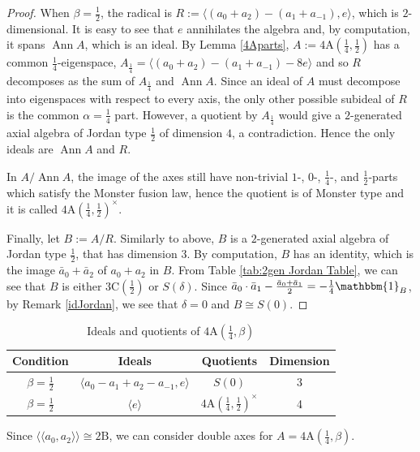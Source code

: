 \documentclass[11pt, a4paper]{article}
\theoremstyle{plain}
\theoremstyle{definition}
\newcommand\al{\alpha}
\newcommand\bt{\beta}
\newcommand\la{\langle}
\newcommand\ra{\rangle}
\newcommand\lla{\langle\!\langle}
\newcommand\rra{\rangle\!\rangle}
\DeclareMathOperator{\Ann}{Ann}
\newcommand{\A}{\mathrm{A}}
\newcommand{\B}{\mathrm{B}}
\newcommand{\C}{\mathrm{C}}
\newcommand{\0}{\overline{0}}
\newcommand{\2}{\overline{2}}
\newcommand{\1}{\mathbbm{1}}
\begin{document}
\begin{proof}
When $\bt = \frac{1}{2}$, the radical is $R := \la (a_0 + a_2) - (a_1 + a_{-1}),  e\ra$, which is $2$-dimensional.  It is easy to see that $e$ annihilates the algebra and, by computation, it spans $\Ann A$, which is an ideal.  By Lemma \ref{4Aparts}, $A := 4\A(\frac{1}{4},\frac{1}{2})$ has a common $\frac{1}{4}$-eigenspace, $A_{\frac{1}{4}} = \la (a_0 + a_2) - (a_1 + a_{-1}) -8e \ra$ and so $R$ decomposes as the sum of $A_{\frac{1}{4}}$ and $\Ann A$.  Since an ideal of $A$ must decompose into eigenspaces with respect to every axis, the only other possible subideal of $R$ is the common $\al = \frac{1}{4}$ part.  However, a quotient by $A_{\frac{1}{4}}$ would give a $2$-generated axial algebra of Jordan type $\frac{1}{2}$ of dimension $4$, a contradiction.  Hence the only ideals are $\Ann A$ and $R$.

In $A/\Ann A$, the image of the axes still have non-trivial $1$-, $0$-, $\frac{1}{4}$-, and $\frac{1}{2}$-parts which satisfy the Monster fusion law, hence the quotient is of Monster type and it is called $4\A(\frac{1}{4}, \frac{1}{2})^\times$.

Finally, let $B := A/R$.  Similarly to above, $B$ is a $2$-generated axial algebra of Jordan type $\frac{1}{2}$, that has dimension $3$.  By computation, $B$ has an identity, which is the image $\bar{a}_0 + \bar{a}_2$ of $a_0 + a_2$ in $B$.  From Table \ref{tab:2gen Jordan Table}, we can see that $B$ is either $3\C(\frac{1}{2})$ or $S(\delta)$.  Since $ \bar{a}_0 \cdot \bar{a}_1 - \frac{\bar{a}_0 + \bar{a}_1}{2} = -\frac{1}{4}\1_B$, by Remark \ref{idJordan}, we see that $\delta = 0$ and $B  \cong S(0)$.
\end{proof}

\begin{table}[h!tb]
	\renewcommand{\arraystretch}{1.5}
	\centering
	\footnotesize
	\begin{tabular}{c|c|c|c}
		\hline
		Condition & Ideals & Quotients & Dimension \\
		\hline
		 $\bt = \frac{1}{2}$ & $\la a_0 - a_1 + a_2 - a_{-1},  e\ra$  & $S(0)$ & 3 \\
		 $\bt = \frac{1}{2}$ & $\la e \ra$  & $4\A(\frac{1}{4}, \frac{1}{2})^\times
		 $ & 4\\
	\end{tabular}
	\caption{Ideals and quotients of $4\A(\frac{1}{4}, \bt)$}\label{tab:4Aprops}
\end{table} 

Since $\lla a_0, a_2 \rra \cong 2\B$, we can consider double axes for $A = 4\A(\frac{1}{4}, \bt)$.
\end{document}
